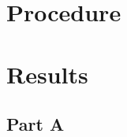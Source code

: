 \documentclass{article}
\begin{document}
\section{Procedure}
\label{sec:procedure}

%
%

\section{Results}
\label{sec:results}

\subsection{Part A}
\label{sec:result_a}
\end{document}
